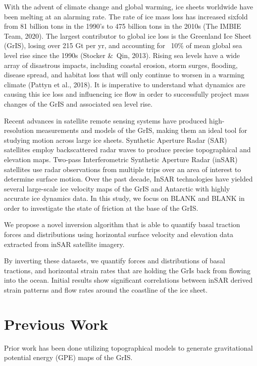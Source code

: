 \documentclass{article}
\begin{document}
With the advent of climate change and global warming, ice sheets worldwide have been melting at an alarming rate. The rate of ice mass loss has increased sixfold from 81 billion tons in the 1990’s to 475 billion tons in the 2010s (The IMBIE Team, 2020). The largest contributor to global ice loss is the Greenland Ice Sheet (GrIS), losing over 215 Gt per yr, and accounting for ~10\% of mean global sea level rise since the 1990s (Stocker \&\ Qin, 2013). Rising sea levels have a wide array of disastrous impacts, including coastal erosion, storm surges, flooding, disease spread, and habitat loss that will only continue to worsen in a warming climate (Pattyn et al., 2018). It is imperative to understand what dynamics are causing this ice loss and influencing ice flow in order to successfully project mass changes of the GrIS and associated sea level rise.

Recent advances in satellite remote sensing systems have produced high-resolution measurements and models of the GrIS, making them an ideal tool for studying motion across large ice sheets. Synthetic Aperture Radar (SAR) satellites employ backscattered radar waves to produce precise topographical and elevation maps. Two-pass Interferometric Synthetic Aperture Radar (inSAR) satellites use radar observations from multiple trips over an area of interest to determine surface motion. Over the past decade, InSAR technologies have yielded several large-scale ice velocity maps of the GrIS and Antarctic with highly accurate ice dynamics data. In this study, we focus on BLANK and BLANK in order to investigate the state of friction at the base of the GrIS. 

We propose a novel inversion algorithm that is able to quantify basal traction forces and distributions using horizontal surface velocity and elevation data extracted from inSAR satellite imagery.

By inverting these datasets, we quantify forces and distributions of basal tractions, and horizontal strain rates that are holding the GrIs back from flowing into the ocean. Initial results show significant correlations between inSAR derived strain patterns and flow rates around the coastline of the ice sheet.


\section{Previous Work}

Prior work has been done utilizing topographical models to generate gravitational potential energy (GPE) maps of the GrIS. 
\end{document}

